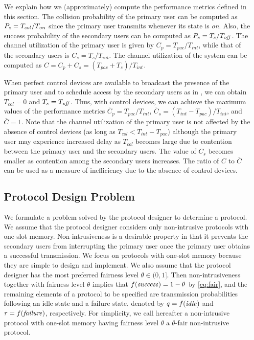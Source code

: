 \documentclass[12pt,draftclsnofoot,onecolumn]{IEEEtran}
\begin{document}
We explain how we (approximately) compute the performance metrics defined in this section.
The collision probability of the primary user can be computed as
$P_c = T_{col}/T_{\textrm{\emph{on}}}$ since the primary user transmits
whenever its state is \emph{on}. Also, the success
probability of the secondary users can be computed as $P_s = T_s/T_{\textrm{\emph{off}}}$.
The channel utilization of the primary user is given by $C_p = T_{pac}/T_{int}$,
while that of the secondary users is $C_s = T_s/T_{int}$.
The channel utilization of the system can be computed as $C = C_p + C_s = (T_{pac} + T_s)/T_{int}$.

When perfect control devices are available to broadcast the presence
of the primary user and to schedule access by the secondary users as in
\cite{chou}, we can obtain $T_{col} = 0$ and $T_s = T_{\textrm{\emph{off}}}$. Thus,
with control devices, we can achieve the maximum values of the performance
metrics $\overline{C}_p = T_{pac}/T_{int}$, $\overline{C}_s = (T_{int} - T_{pac})/T_{int}$,
and $\overline{C} = 1$.
Note that the channel utilization of the primary user is not affected by the absence of
control devices (as long as $T_{col} < T_{int} - T_{pac}$) although the primary user may experience increased delay
as $T_{col}$ becomes large due to contention between the primary user and the secondary users.
The value of $C_s$ becomes smaller as contention among the secondary users increases.
The ratio of $C$ to $\overline{C}$ can be used as a measure of inefficiency
due to the absence of control devices.

\subsection{Protocol Design Problem}

We formulate a problem solved by the protocol designer to determine
a protocol.
We assume that the protocol designer considers only non-intrusive protocols
with one-slot memory. Non-intrusiveness is a desirable property in that
it prevents the secondary users from interrupting the primary user once
the primary user obtains a successful transmission. We focus on protocols with one-slot
memory because they are simple to design and implement.
We also assume that the protocol designer has the most preferred fairness
level $\theta \in (0,1]$. Then non-intrusiveness together with fairness
level $\theta$ implies that $f(\textrm{\emph{success}}) = 1-\theta$ by \eqref{eq:fair}, and the remaining elements of
a protocol to be specified are transmission probabilities
following an idle state and a failure state, denoted by $q = f(\textrm{\emph{idle}})$ and
$r = f(\textrm{\emph{failure}})$, respectively. For simplicity, we call hereafter
a non-intrusive protocol with one-slot memory having fairness level $\theta$
a $\theta$-fair non-intrusive protocol.
\end{document}
